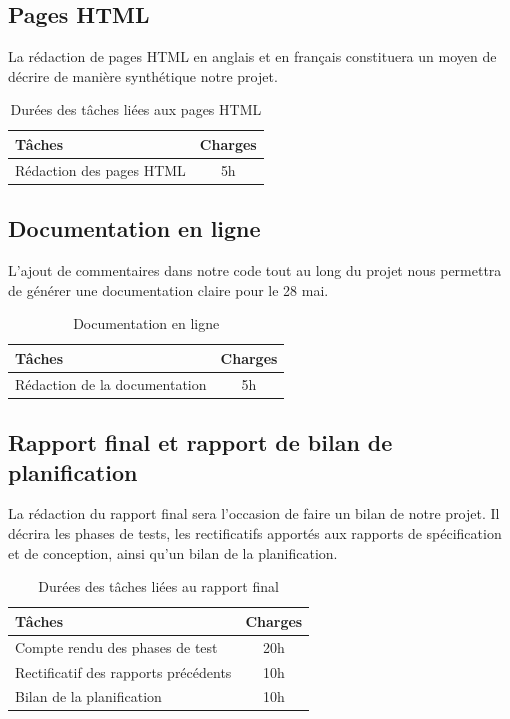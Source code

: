 \documentclass[a4paper]{report}
\begin{document}
\subsection{Pages HTML}
La rédaction de pages HTML en anglais et en français constituera un moyen de décrire de manière synthétique notre projet.


\begin{table}[H]
\centering
  \begin{tabularx}{0.8\textwidth}{| X | c |}
    \hline
	Tâches & Charges \\
    \hline
    Rédaction des pages HTML & 5h\\
    \hline
  \end{tabularx}
  \caption{Durées des tâches liées aux pages HTML}
\end{table}


\subsection{Documentation en ligne}

L'ajout de commentaires dans notre code tout au long du projet nous permettra de générer une documentation claire pour le 28 mai.

\begin{table}[H]
\centering
  \begin{tabularx}{0.8\textwidth}{| X | c |}
    \hline
	Tâches & Charges \\
    \hline
    Rédaction de la documentation & 5h \\
    \hline
  \end{tabularx}
  \caption{Documentation en ligne}
\end{table}


\subsection{Rapport final et rapport de bilan de planification}

La rédaction du rapport final sera l'occasion de faire un bilan de notre projet. Il décrira les phases de tests, les rectificatifs apportés aux rapports de spécification et de conception, ainsi qu'un bilan de la planification.

\begin{table}[H]
\centering
  \begin{tabularx}{0.8\textwidth}{| X | c |}
    \hline
	Tâches & Charges \\
    \hline
    Compte rendu des phases de test & 20h \\
    Rectificatif des rapports précédents & 10h \\
    Bilan de la planification & 10h \\
    \hline
  \end{tabularx}
  \caption{Durées des tâches liées au rapport final}
\end{table}
\end{document}
